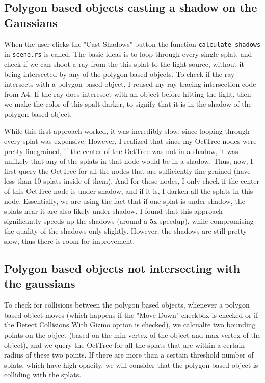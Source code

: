 \documentclass {article}
\begin{document}
\subsection{Polygon based objects casting a shadow on the Gaussians}

When the user clicks the "Cast Shadows" button the function \lstinline[style=inlinecode]{calculate_shadows} in \lstinline[style=inlinecode]{scene.rs} is called. The basic ideas is to loop through every single splat, and check if we can shoot a ray from the this splat to the light source, without it being intersected by any of the polygon based objects. To check if the ray intersects with a polygon based object, I reused my ray tracing intersection code from A4. If the ray does interesect with an object before hitting the light, then we make the color of this spalt darker, to signify that it is in the shadow of the polygon based object.


While this first approach worked, it was incredibly slow, since looping through every splat was expensive. However, I realized that since my OctTree nodes were pretty finegrained, if the center of the OctTree was not in a shadow, it was unlikely that any of the splats in that node would be in a shadow. Thus, now, I first query the OctTree for all the nodes that are sufficiently fine grained (have less than 10 splats inside of them). And for these nodes, I only check if the center of this OctTree node is under shadow, and if it is, I darken all the splats in this node. Essentially, we are using the fact that if one splat is under shadow, the splats near it are also likely under shadow. I found that this approach significantly speeds up the shadows (around a 5x speedup), while compromising the quality of the shadows only slightly. However, the shadows are still pretty slow, thus there is room for improvement.

\subsection{Polygon based objects not intersecting with the gaussians}

To check for collisions between the polygon based objects, whenever a polygon based object moves (which happens if the "Move Down" checkbox is checked or if the Detect Collisions With Gizmo option is checked), we calcualte two bounding points on the object (based on the min vertex of the object and max vertex of the object), and we query the OctTree for all the splats that are within a certain radius of these two points. If there are more than a certain threshold number of splats, which have high opacity, we will consider that the polygon based object is colliding with the splats.
\end{document}
